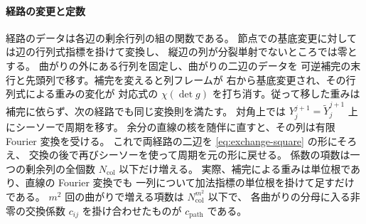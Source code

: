 \paragraph{経路の変更と定数}
経路のデータは各辺の剰余行列の組の関数である。
節点での基底変更に対しては辺の行列式指標を掛けて変換し、
縦辺の列が分裂単射でないところでは零とする。
曲がりの外にある行列を固定し、曲がりの二辺のデータを
可逆補完の末行と先頭列で移す。補完を変えると列フレームが
右から基底変更され、その行列式による重みの変化が
対応式の \(\chi(\det g)\) を打ち消す。従って移した重みは
補完に依らず、次の経路でも同じ変換則を満たす。
対角上では \(Y^{j+1}_j=\widetilde Y^{j+1}_j\) 上にシーソーで周期を移す。
余分の直線の核を随伴に直すと、その列は有限 Fourier 変換を受ける。
これで両経路の二辺を \eqref{eq:exchange-square} の形にそろえ、
交換の後で再びシーソーを使って周期を元の形に戻せる。
係数の項数は一つの剰余列の全個数 \(N_\mathrm{col}\) 以下だけ増える。
実際、補完による重みは単位根であり、直線の Fourier 変換でも
一列について加法指標の単位根を掛けて足すだけである。
\(m^2\) 回の曲がりで増える項数は \(N_\mathrm{col}^{m^2}\) 以下で、
各曲がりの分母に入る非零の交換係数 \(c_{ij}\) を掛け合わせたものが
\(c_{\mathrm{path}}\) である。

